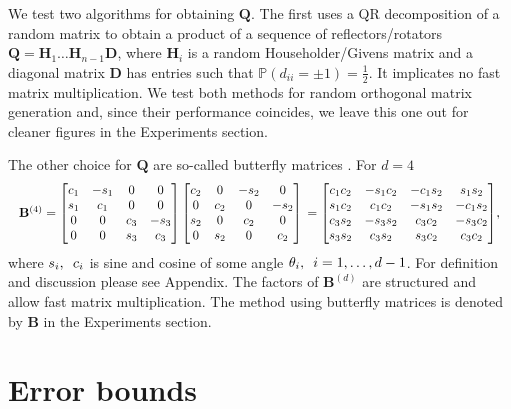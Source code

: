 We test two algorithms for obtaining $\mathbf{Q}$. The first uses a QR decomposition of a random matrix to obtain a product of a sequence of reflectors/rotators ${\mathbf{Q} = \mathbf{H}_1 \dots \mathbf{H}_{n-1} \mathbf{D}}$, where $\mathbf{H}_i$ is a random Householder/Givens matrix
and a diagonal matrix $\mathbf{D}$ has entries such that
$\mathbb{P}(d_{ii} = \pm 1) = \frac{1}{2}$.
It implicates no fast matrix multiplication. We test both methods for random orthogonal matrix generation and, since their performance coincides, we leave this one out for cleaner figures in the Experiments section.

The other choice for $\mathbf{Q}$ are so-called butterfly matrices \citep{genz1998methods}. For ${d = 4}$
\begin{equation*}\resizebox{.99\hsize}{!}{$
    \mathbf{B}^{(4)} =
    \begin{bmatrix}
        c_1 & -s_1 & 0 & 0 \\
        s_1 & c_1 & 0 & 0 \\
        0 & 0 & c_3 & -s_3 \\
        0 & 0 & s_3 & c_3 \\
    \end{bmatrix}
    \begin{bmatrix}
        c_2 & 0 & -s_2 & 0 \\
        0 & c_2 & 0 & -s_2 \\
        s_2 & 0 & c_2 & 0 \\
        0 & s_2 & 0 & c_2 \\
    \end{bmatrix}\\
    =
    \begin{bmatrix}
        c_1c_2 & -s_1c_2 & -c_1s_2 & s_1s_2 \\
        s_1c_2 & c_1c_2 & -s_1s_2 & -c_1s_2 \\
        c_3s_2 & -s_3s_2 & c_3c_2 & -s_3c_2 \\
        s_3s_2 & c_3s_2 & s_3c_2 & c_3c_2 \\
    \end{bmatrix}$},
\end{equation*}
where $s_i, \enskip c_i$ is sine and cosine of some angle ${\theta_i, \enskip i= 1, \dots, d-1}$. For definition and discussion please see Appendix. The factors of $\mathbf{B}^{(d)}$ are structured and allow fast matrix multiplication.
The method using butterfly matrices is denoted by $\mathbf{B}$ in the Experiments section.


\section{Error bounds}
\label{sec:approximation_error_bounds}

